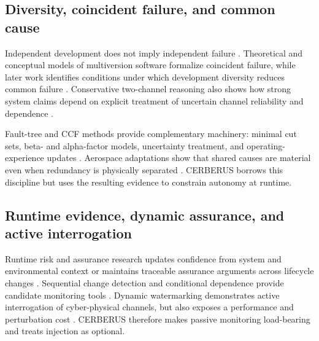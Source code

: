\subsection{Diversity, coincident failure, and common cause}
Independent development does not imply independent failure \cite{KnightLeveson1986}. Theoretical and conceptual models of multiversion software formalize coincident failure, while later work identifies conditions under which development diversity reduces common failure \cite{EckhardtLee1985,LittlewoodMiller1989,SalakoStrigini2014}. Conservative two-channel reasoning also shows how strong system claims depend on explicit treatment of uncertain channel reliability and dependence \cite{LittlewoodRushby2012,LittlewoodPovyakalo2013}.

Fault-tree and CCF methods provide complementary machinery: minimal cut sets, beta- and alpha-factor models, uncertainty treatment, and operating-experience updates \cite{Vesely1981,Mosleh1988,Mosleh1998,IEC61508_6_2010,MaKvarfordt2022}. Aerospace adaptations show that shared causes are material even when redundancy is physically separated \cite{Stott2010,Hark2015}. CERBERUS borrows this discipline but uses the resulting evidence to constrain autonomy at runtime.

\subsection{Runtime evidence, dynamic assurance, and active interrogation}
Runtime risk and assurance research updates confidence from system and environmental context or maintains traceable assurance arguments across lifecycle changes \cite{Hartsell2021,Sljivo2024,FeatherPinto2023,ContinuousAssurance2025}. Sequential change detection and conditional dependence provide candidate monitoring tools \cite{Granger1969,Page1954,BassevilleNikiforov1993,Schreiber2000}. Dynamic watermarking demonstrates active interrogation of cyber-physical channels, but also exposes a performance and perturbation cost \cite{MoSinopoli2009,MoWeerakkodySinopoli2015,SatchidanandanKumar2017}. CERBERUS therefore makes passive monitoring load-bearing and treats injection as optional.

